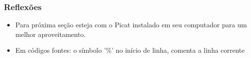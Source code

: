 \begin{frame}[fragile]
\frametitle{Reflexões}

\begin{itemize}



      \pause
      \item Para próxima seção esteja com o Picat instalado em seu 
      computador para um melhor aproveitamento.
    \pause

  \item Em códigos fontes: o símbolo '\%' no início de linha, comenta a linha  corrente

\end{itemize}

\end{frame}

